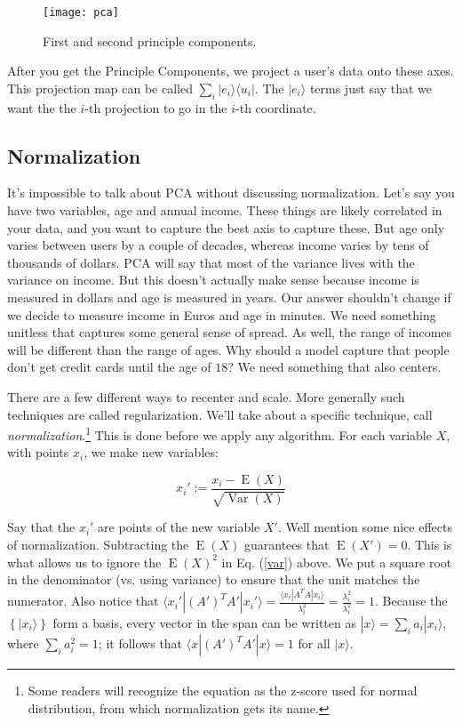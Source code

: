 \documentclass{amsbook}
\begin{document}
\begin{figure}
\caption{First and second principle components.}
\centering
\texttt{[image: pca]}
\end{figure}

After you get the Principle Components, we project a user's data onto these axes.  This projection map can be called $\sum_i |e_i\rangle\langle u_i|$.  The $|e_i\rangle$ terms just say that we want the the $i$-th projection to go in the $i$-th coordinate.

\subsection{Normalization}

It's impossible to talk about PCA without discussing normalization.  Let's say you have two variables, age and annual income.  These things are likely correlated in your data, and you want to capture the best axis to capture these.  But age only varies between users by a couple of decades, whereas income varies by tens of thousands of dollars.  PCA will say that most of the variance lives with the variance on income.  But this doesn't actually make sense because income is measured in dollars and age is measured in years.  Our answer shouldn't change if we decide to measure income in Euros and age in minutes.  We need something unitless that captures some general sense of spread.  As well, the range of incomes will be different than the range of ages.  Why should a model capture that people don't get credit cards until the age of $18$?  We need something that also centers.

There are a few different ways to recenter and scale.  More generally such techniques are called regularization.  We'll take about a specific technique, call {\em normalization}.\footnote{Some readers will recognize the equation as the z-score used for normal distribution, from which normalization gets its name.}  This is done before we apply any algorithm.  For each variable $X$, with points $x_i$, we make new variables:

$$
x_i':=\frac{x_i-\operatorname{E}(X)}{\sqrt{\operatorname{Var}(X)}}
$$

Say that the $x_i'$ are points of the new variable $X'$.  Well mention some nice effects of normalization.  Subtracting the $\operatorname{E}(X)$ guarantees that $\operatorname{E}(X')=0$.  This is what allows us to ignore the $\operatorname{E}(X)^2$ in Eq. (\ref{var}) above.  We put a square root in the denominator (vs. using variance) to ensure that the unit matches the numerator.  Also notice that $\langle x_i'|(A')^TA'|x_i'\rangle=\frac{\langle x_i|A^TA|x_i\rangle}{\lambda_i^2} = \frac{\lambda_i^2}{\lambda_i^2}=1$.  Because the $\left\{|x_i\rangle\right\}$ form a basis, every vector in the span can be written as $|x\rangle=\sum_ia_i|x_i\rangle$, where $\sum_ia_i^2=1$; it follows that $\langle x|(A')^TA'|x\rangle=1$ for all $|x\rangle$.
\end{document}
